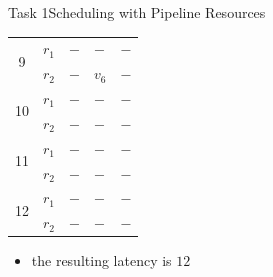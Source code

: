 \begin{frame}{Task 1}{Scheduling with Pipeline Resources}
\begin{solutionnoinc}
\begin{tabular}{c|c|l|l|l|}
      \hline \multirow{2}{*}{9}  & $r_1$ & $-$        & $-$        & $-$        \\
      \cline { 2 - 5 }           & $r_2$ & $-$        & $v_6$      & $-$        \\
      \hline \multirow{2}{*}{10} & $r_1$ & $-$        & $-$        & $-$        \\
      \cline { 2 - 5 }           & $r_2$ & $-$        & $-$        & $-$        \\
      \hline \multirow{2}{*}{11} & $r_1$ & $-$        & $-$        & $-$        \\
      \cline { 2 - 5 }           & $r_2$ & $-$        & $-$        & $-$        \\
      \hline \multirow{2}{*}{12} & $r_1$ & $-$        & $-$        & $-$        \\
      \cline { 2 - 5 }           & $r_2$ & $-$        & $-$        & $-$        \\
      \hline
      \end{tabular}
  \end{solutionnoinc}
\end{frame}
\begin{frame}
  \begin{solutionnoinc}
    \begin{itemize}
      \item the resulting latency is $12$
    \end{itemize}
  \end{solutionnoinc}
\end{frame}
